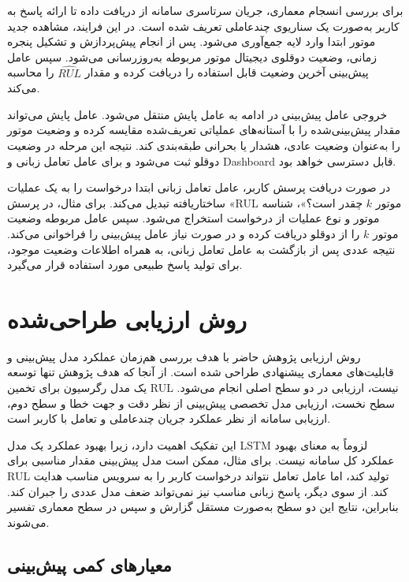 برای بررسی انسجام معماری، جریان سرتاسری سامانه از دریافت داده تا
ارائه پاسخ به کاربر به‌صورت یک سناریوی چندعاملی تعریف شده است.
در این فرایند، مشاهده جدید موتور ابتدا وارد لایه جمع‌آوری می‌شود.
پس از انجام پیش‌پردازش و تشکیل پنجره زمانی، وضعیت دوقلوی دیجیتال
موتور مربوطه به‌روزرسانی می‌شود. سپس عامل پیش‌بینی آخرین وضعیت
قابل استفاده را دریافت کرده و مقدار $\widehat{RUL}$ را محاسبه
می‌کند.

خروجی عامل پیش‌بینی در ادامه به عامل پایش منتقل می‌شود. عامل
پایش می‌تواند مقدار پیش‌بینی‌شده را با آستانه‌های عملیاتی تعریف‌شده
مقایسه کرده و وضعیت موتور را به‌عنوان وضعیت عادی، هشدار یا بحرانی
طبقه‌بندی کند. نتیجه این مرحله در وضعیت دوقلو ثبت می‌شود و برای
عامل تعامل زبانی و \gls{Dashboard} قابل دسترسی خواهد بود.

در صورت دریافت پرسش کاربر، عامل تعامل زبانی ابتدا درخواست را به
یک عملیات ساختاریافته تبدیل می‌کند. برای مثال، در پرسش
«\gls{RUL} موتور $k$ چقدر است؟»، شناسه موتور و نوع عملیات از
درخواست استخراج می‌شود. سپس عامل مربوطه وضعیت موتور $k$ را از
دوقلو دریافت کرده و در صورت نیاز عامل پیش‌بینی را فراخوانی
می‌کند. نتیجه عددی پس از بازگشت به عامل تعامل زبانی، به همراه
اطلاعات وضعیت موجود، برای تولید پاسخ طبیعی مورد استفاده قرار
می‌گیرد.


\section{روش ارزیابی طراحی‌شده}
\label{sec:eval-design}

روش ارزیابی پژوهش حاضر با هدف بررسی هم‌زمان عملکرد مدل پیش‌بینی
و قابلیت‌های معماری پیشنهادی طراحی شده است. از آنجا که هدف پژوهش
تنها توسعه یک مدل رگرسیون برای تخمین \gls{RUL} نیست، ارزیابی در
دو سطح اصلی انجام می‌شود. سطح نخست، ارزیابی مدل تخصصی پیش‌بینی از
نظر دقت و جهت خطا و سطح دوم، ارزیابی سامانه از نظر عملکرد جریان
چندعاملی و تعامل با کاربر است.

این تفکیک اهمیت دارد، زیرا بهبود عملکرد یک مدل \gls{LSTM}
لزوماً به معنای بهبود عملکرد کل سامانه نیست. برای مثال، ممکن است
مدل پیش‌بینی مقدار مناسبی برای \gls{RUL} تولید کند، اما عامل
تعامل نتواند درخواست کاربر را به سرویس مناسب هدایت کند. از سوی
دیگر، پاسخ زبانی مناسب نیز نمی‌تواند ضعف مدل عددی را جبران کند.
بنابراین، نتایج این دو سطح به‌صورت مستقل گزارش و سپس در سطح
معماری تفسیر می‌شوند.

\subsection{معیارهای کمی پیش‌بینی}
\label{sec:prediction-metrics}

